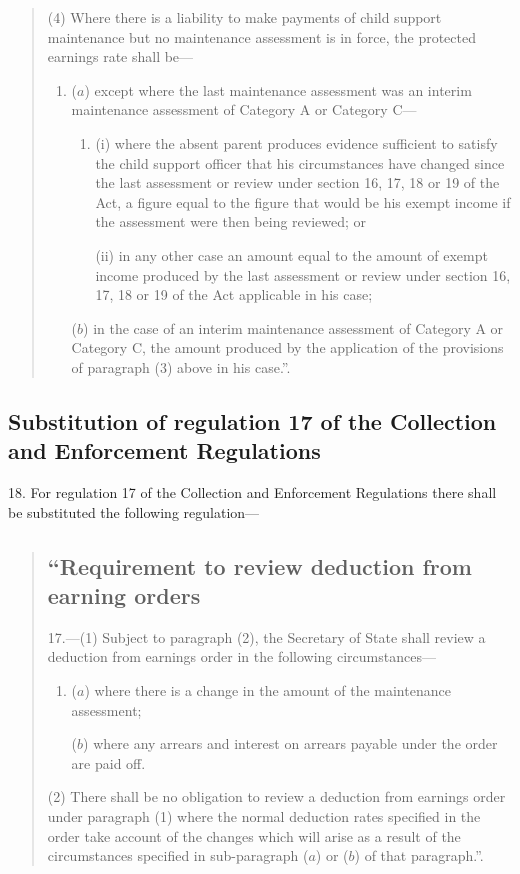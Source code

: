 \documentclass[a4paper]{article}
\begin{document}
\begin{quotation}
(4) Where there is a liability to make payments of child support maintenance but no maintenance assessment is in force, the protected earnings rate shall be—
\begin{enumerate}\item[]
($a$) except where the last maintenance assessment was an interim maintenance assessment of Category A or Category C—
\begin{enumerate}\item[]
(i) where the absent parent produces evidence sufficient to satisfy the child support officer that his circumstances have changed since the last assessment or review under section 16, 17, 18 or 19 of the Act, a figure equal to the figure that would be his exempt income if the assessment were then being reviewed; or

(ii) in any other case an amount equal to the amount of exempt income produced by the last assessment or review under section 16, 17, 18 or 19 of the Act applicable in his case;
\end{enumerate}

($b$) in the case of an interim maintenance assessment of Category A or Category C, the amount produced by the application of the provisions of paragraph (3) above in his case.”.
\end{enumerate}
\end{quotation}

\subsection[18. Substitution of regulation 17 of the Collection and Enforcement Regulations]{Substitution of regulation 17 of the Collection and Enforcement Regulations}

18.  For regulation 17 of the Collection and Enforcement Regulations there shall be substituted the following regulation—
\begin{quotation}
\subsection*{\sloppy “Requirement to review deduction from earning orders}

17.—(1) Subject to paragraph (2), the Secretary of State shall review a deduction from earnings order in the following circumstances—
\begin{enumerate}\item[]
($a$) where there is a change in the amount of the maintenance assessment;

($b$) where any arrears and interest on arrears payable under the order are paid off.
\end{enumerate}

(2) There shall be no obligation to review a deduction from earnings order under paragraph (1) where the normal deduction rates specified in the order take account of the changes which will arise as a result of the circumstances specified in sub-paragraph ($a$) or ($b$) of that paragraph.”.
\end{quotation}
\end{document}
